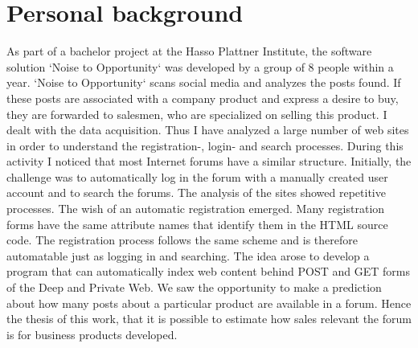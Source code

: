 \section{Personal background}
As part of a bachelor project at the Hasso Plattner Institute, the software solution `Noise to Opportunity` was developed by a group of 8 people within a year. `Noise to Opportunity` scans social media and analyzes the posts found. If these posts are associated with a company product and express a desire to buy, they are forwarded to salesmen, who are specialized on selling this product. I dealt with the data acquisition. Thus I have analyzed a large number of web sites in order to understand the registration-, login- and search processes. During this activity I noticed that most Internet forums have a similar structure. Initially, the challenge was to automatically log in the forum with a manually created user account and to search the forums. The analysis of the sites showed repetitive processes. The wish of an automatic registration emerged. Many registration forms have the same attribute names that identify them in the HTML source code. The registration process follows the same scheme and is therefore automatable just as logging in and searching. The idea arose to develop a program that can automatically index web content behind POST and GET forms of the Deep and Private Web. We saw the opportunity to make a prediction about how many posts about a particular product are available in a forum. Hence the thesis of this work, that it is possible to estimate how sales relevant the forum is for business products developed.
\newpage